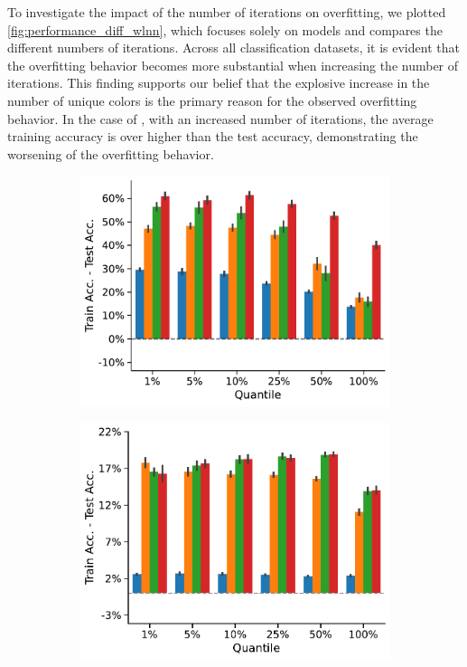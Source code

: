To investigate the impact of the number of \wl iterations on overfitting, we plotted \cref{fig:performance_diff_wlnn}, which focuses solely on \wlnn models and compares the different numbers of \wl iterations. Across all classification datasets, it is evident that the overfitting behavior becomes more substantial when increasing the number of \wl iterations. This finding supports our belief that the explosive increase in the number of unique colors is the primary reason for the observed overfitting behavior. In the case of \enzymes, with an increased number of \wl iterations, the average training accuracy is over  higher than the test accuracy, demonstrating the worsening of the overfitting behavior.

\begin{figure}[!htb]
	\centering
	\begin{subfigure}[b]{0.3\textwidth}
		\centering
		\includegraphics[width=\textwidth]{Figures/train_test_diff_k_wl_ENZYMES.pdf}
		\vspace*{-4ex} 
		\caption{\enzymes}
	\end{subfigure}
	\hfill
	\begin{subfigure}[b]{0.3\textwidth}
		\centering
		\includegraphics[width=\textwidth]{Figures/train_test_diff_k_wl_IMDB-BINARY.pdf}

\end{subfigure}
\end{figure}
